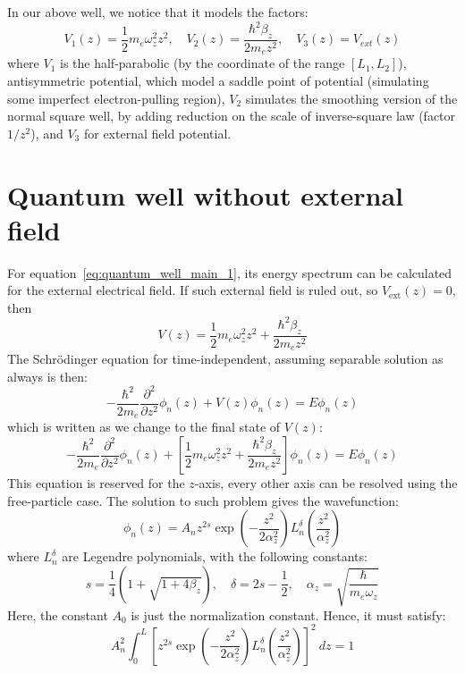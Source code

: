 \documentclass{article}
\begin{document}
In our above well, we notice that it models the factors: 
\begin{equation}
    V_{1}(z)=\frac{1}{2} m_{{e}}\omega_{z}^{2}z^{2},\quad V_{2}(z)=\frac{\hbar^{2}\beta_{z}}{2m_{e}z^{2}},\quad V_{3}(z) = V_{ext}(z)
\end{equation}
where $V_{1}$ is the half-parabolic (by the coordinate of the range $[L_{1},L_{2}]$), antisymmetric potential, which model a saddle point of potential (simulating some imperfect electron-pulling region), $V_{2}$ simulates the smoothing version of the normal square well, by adding reduction on the scale of inverse-square law (factor $1/z^{2}$), and $V_{3}$ for external field potential. 
\section{Quantum well without external field}
For equation~\ref{eq:quantum_well_main_1}, its energy spectrum can be calculated for the external electrical field. If such external field is ruled out, so $V_{\mathrm{ext}}(z)=0$, then 
\begin{equation}\label{eq:quantum_well_main_2}
    V(z)=\frac{1}{2}m_{{e}}\omega_{z}^{2}z^{2}+ \frac{\hbar^{2}\beta_{z}}{2m_{e}z^{2}} 
\end{equation}
The Schrödinger equation for time-independent, assuming separable solution as always is then:
\begin{equation}
    -\frac{\hbar^{2}}{2m_{e}} \frac{\partial^{2}}{\partial z^{2}} \phi_{n}(z) + V(z)\phi_{n}(z) = E\phi_{n}(z)
\end{equation}
which is written as we change to the final state of $V(z)$:
\begin{equation}
    -\frac{\hbar^{2}}{2m_{e}} \frac{\partial^{2}}{\partial z^{2}} \phi_{n}(z) + \left[\frac{1}{2}m_{{e}}\omega_{z}^{2}z^{2}+ \frac{\hbar^{2}\beta_{z}}{2m_{e}z^{2}}\right]\phi_{n}(z) = E\phi_{n}(z)
\end{equation}
This equation is reserved for the $z$-axis, every other axis can be resolved using the free-particle case. The solution to such problem gives the wavefunction: 
\begin{equation}
    \phi_{n}(z) = A_{n}z^{2s}\exp{\left(-\frac{z^{2}}{2\alpha_{z}^{2}}\right)}L^{\delta}_{n}\left(\frac{z^{2}}{\alpha_{z}^{2}}\right)
\end{equation}
where $L^{\delta}_{n}$ are Legendre polynomials, with the following constants: 
\begin{equation}
    s=\frac{1}{4}\left(1+\sqrt{1+4\beta_{z}}\right), \quad \delta = 2s - \frac{1}{2}, \quad \alpha_{z} = \sqrt{\frac{\hbar}{m_{e}\omega_{z}}}
\end{equation}
Here, the constant $A_{0}$ is just the normalization constant. Hence, it must satisfy: 
\begin{equation}
    A_{n}^{2} \int_{0}^{L} \left[z^{2s}\exp{\left(-\frac{z^{2}}{2\alpha_{z}^{2}}\right)}L^{\delta}_{n}\left(\frac{z^{2}}{\alpha_{z}^{2}}\right)\right]^{2} \: dz = 1
\end{equation}
\end{document}
